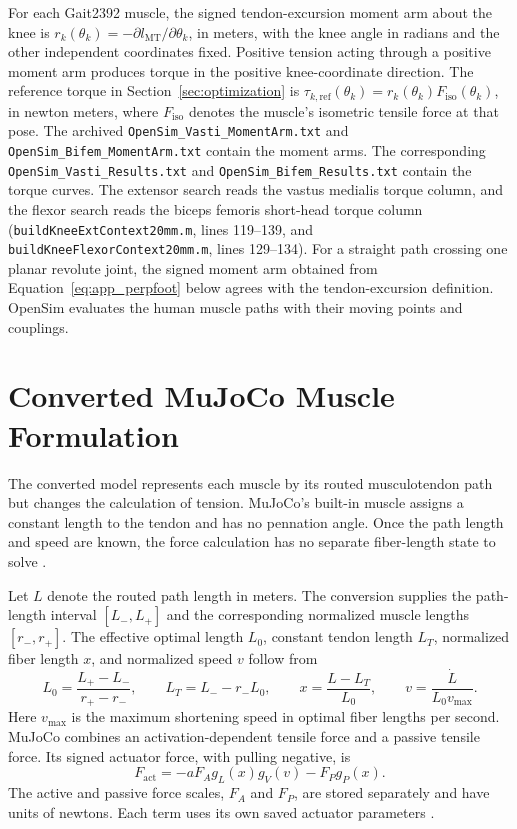 For each Gait2392 muscle, the signed tendon-excursion moment arm about the knee is
$r_k(\theta_k)=-\partial l_{\mathrm{MT}}/\partial\theta_k$, in meters, with the knee angle in radians and the other independent coordinates fixed.
Positive tension acting through a positive moment arm produces torque in the positive knee-coordinate direction.
The reference torque in Section~\ref{sec:optimization} is $\tau_{k,\mathrm{ref}}(\theta_k)=r_k(\theta_k)F_{\mathrm{iso}}(\theta_k)$, in newton meters, where $F_{\mathrm{iso}}$ denotes the muscle's isometric tensile force at that pose.
The archived \nolinkurl{OpenSim_Vasti_MomentArm.txt} and \nolinkurl{OpenSim_Bifem_MomentArm.txt} contain the moment arms.
The corresponding \nolinkurl{OpenSim_Vasti_Results.txt} and \nolinkurl{OpenSim_Bifem_Results.txt} contain the torque curves.
The extensor search reads the vastus medialis torque column, and the flexor search reads the biceps femoris short-head torque column
(\texttt{buildKneeExtContext20mm.m}, lines 119--139, and \texttt{buildKneeFlexorContext20mm.m}, lines 129--134).
For a straight path crossing one planar revolute joint, the signed moment arm obtained from Equation~\eqref{eq:app_perpfoot} below agrees with the tendon-excursion definition.
OpenSim evaluates the human muscle paths with their moving points and couplings.

\section{Converted MuJoCo Muscle Formulation}
\label{sec:muscle-models}

The converted model represents each muscle by its routed musculotendon path but changes the calculation of tension. MuJoCo's built-in muscle assigns a constant length to the tendon and has no pennation angle. Once the path length and speed are known, the force calculation has no separate fiber-length state to solve \citep{mujoco_muscle_docs_237}.

Let $L$ denote the routed path length in meters. The conversion supplies the path-length interval $[L_-,L_+]$ and the corresponding normalized muscle lengths $[r_-,r_+]$. The effective optimal length $L_0$, constant tendon length $L_T$, normalized fiber length $x$, and normalized speed $v$ follow from
\begin{equation}
 L_0=\frac{L_+-L_-}{r_+-r_-},\qquad L_T=L_- -r_-L_0,\qquad
 x=\frac{L-L_T}{L_0},\qquad v=\frac{\dot L}{L_0 v_{\max}}.
 \label{eq:app_mj_normalize}
\end{equation}
Here $v_{\max}$ is the maximum shortening speed in optimal fiber lengths per second. MuJoCo combines an activation-dependent tensile force and a passive tensile force. Its signed actuator force, with pulling negative, is
\begin{equation}
 F_{\mathrm{act}}=-a F_A g_L(x)g_V(v)-F_P g_P(x).
 \label{eq:mj-muscle}
\end{equation}
The active and passive force scales, $F_A$ and $F_P$, are stored separately and have units of newtons. Each term uses its own saved actuator parameters \citep{mujoco_muscle_source_237}.


